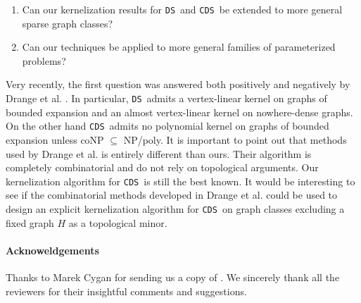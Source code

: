 \documentclass[11pt]{article}
\newcommand{\tDS}{{\texttt{\sc DS}}}
\newcommand{\tCDS}{{\texttt{\sc CDS}}}
\begin{document}
\begin{enumerate}
\item Can our kernelization results for  \tDS\ and  \tCDS\  be extended to more general sparse graph classes?
\item Can our techniques be applied to more general families of parameterized problems?
\end{enumerate}




Very recently,  the first question was answered both positively and negatively by Drange et al. \cite{Drange2015}.  In particular, \tDS \ admits a vertex-linear kernel on graphs of bounded expansion and an almost vertex-linear kernel on nowhere-dense graphs. On the other hand  
  \tCDS  \ admits no polynomial kernel on graphs of bounded expansion unless \textsf{coNP} 
  $\subseteq$  \textsf{NP/poly}.  It is important to point out that methods used by Drange et al. \cite{Drange2015} is entirely different than ours. Their algorithm is completely combinatorial and do not rely on topological arguments. Our kernelization algorithm for \tCDS\ is still the best known. It would be interesting to see if the combinatorial methods developed in 
  Drange et al. \cite{Drange2015} could be used to design an explicit kernelization algorithm for \tCDS\ on graph classes excluding a fixed graph $H$ as a topological minor. 
 


\paragraph{Acknoweldgements}
Thanks to Marek Cygan for sending us a copy of \cite{CyganGH12}. We sincerely thank all the reviewers for their insightful comments and suggestions. 
\end{document}
